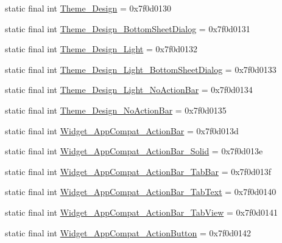 \begin{DoxyCompactItemize}
\item 
static final int \mbox{\hyperlink{classandroid_1_1support_1_1design_1_1R_1_1style_aa6796c89937f6e8b6b04b941eee44a5d}{Theme\+\_\+\+Design}} = 0x7f0d0130
\item 
static final int \mbox{\hyperlink{classandroid_1_1support_1_1design_1_1R_1_1style_a05188dcbcc8c3841fac2c1daaed4d968}{Theme\+\_\+\+Design\+\_\+\+Bottom\+Sheet\+Dialog}} = 0x7f0d0131
\item 
static final int \mbox{\hyperlink{classandroid_1_1support_1_1design_1_1R_1_1style_a27db99a1790aa46efd7c27e61378587a}{Theme\+\_\+\+Design\+\_\+\+Light}} = 0x7f0d0132
\item 
static final int \mbox{\hyperlink{classandroid_1_1support_1_1design_1_1R_1_1style_aefdcef3769b44e270b497ed77e7723c9}{Theme\+\_\+\+Design\+\_\+\+Light\+\_\+\+Bottom\+Sheet\+Dialog}} = 0x7f0d0133
\item 
static final int \mbox{\hyperlink{classandroid_1_1support_1_1design_1_1R_1_1style_aeb5bcafc332033d28688b206776ffada}{Theme\+\_\+\+Design\+\_\+\+Light\+\_\+\+No\+Action\+Bar}} = 0x7f0d0134
\item 
static final int \mbox{\hyperlink{classandroid_1_1support_1_1design_1_1R_1_1style_a383114c8b35611f608ba67f8cc1f1803}{Theme\+\_\+\+Design\+\_\+\+No\+Action\+Bar}} = 0x7f0d0135
\item 
static final int \mbox{\hyperlink{classandroid_1_1support_1_1design_1_1R_1_1style_ac6fabcbdfed53c737b1f84943d09135e}{Widget\+\_\+\+App\+Compat\+\_\+\+Action\+Bar}} = 0x7f0d013d
\item 
static final int \mbox{\hyperlink{classandroid_1_1support_1_1design_1_1R_1_1style_ab97887a30acd25327d0b7891149466a8}{Widget\+\_\+\+App\+Compat\+\_\+\+Action\+Bar\+\_\+\+Solid}} = 0x7f0d013e
\item 
static final int \mbox{\hyperlink{classandroid_1_1support_1_1design_1_1R_1_1style_ae40e99b212bec9e1c06063f41df88461}{Widget\+\_\+\+App\+Compat\+\_\+\+Action\+Bar\+\_\+\+Tab\+Bar}} = 0x7f0d013f
\item 
static final int \mbox{\hyperlink{classandroid_1_1support_1_1design_1_1R_1_1style_acd485e388828fa5a420f5e50cfcd5c88}{Widget\+\_\+\+App\+Compat\+\_\+\+Action\+Bar\+\_\+\+Tab\+Text}} = 0x7f0d0140
\item 
static final int \mbox{\hyperlink{classandroid_1_1support_1_1design_1_1R_1_1style_a534241f1a7151bbcf5762714684ab67c}{Widget\+\_\+\+App\+Compat\+\_\+\+Action\+Bar\+\_\+\+Tab\+View}} = 0x7f0d0141
\item 
static final int \mbox{\hyperlink{classandroid_1_1support_1_1design_1_1R_1_1style_adc94449ee45cee4172348d277d2e978c}{Widget\+\_\+\+App\+Compat\+\_\+\+Action\+Button}} = 0x7f0d0142

\end{DoxyCompactItemize}
